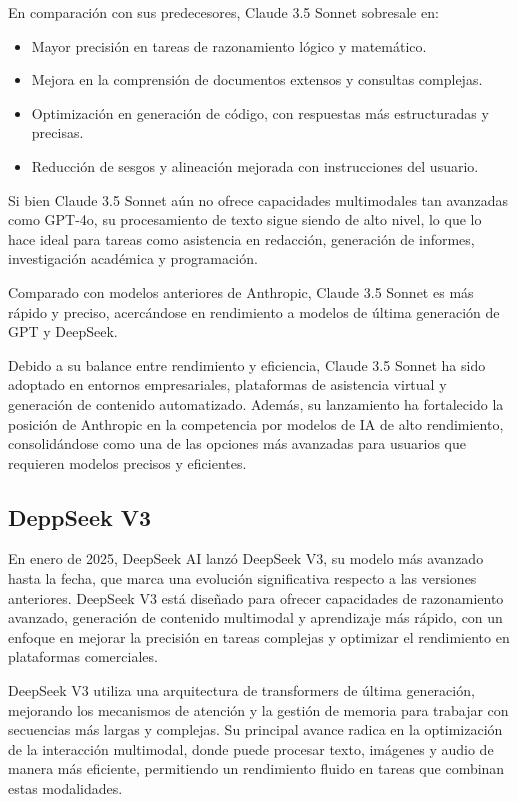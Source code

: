 En comparación con sus predecesores, Claude 3.5 Sonnet sobresale en:

\begin{itemize}
    \item Mayor precisión en tareas de razonamiento lógico y matemático.
    \item Mejora en la comprensión de documentos extensos y consultas complejas.
    \item Optimización en generación de código, con respuestas más estructuradas y precisas.
    \item Reducción de sesgos y alineación mejorada con instrucciones del usuario.
\end{itemize}

Si bien Claude 3.5 Sonnet aún no ofrece capacidades multimodales tan avanzadas como GPT-4o, su procesamiento de texto sigue siendo de alto nivel, lo que lo hace ideal para tareas como asistencia en redacción, generación de informes, investigación académica y programación.

Comparado con modelos anteriores de Anthropic, Claude 3.5 Sonnet es más rápido y preciso, acercándose en rendimiento a modelos de última generación de GPT y DeepSeek.

Debido a su balance entre rendimiento y eficiencia, Claude 3.5 Sonnet ha sido adoptado en entornos empresariales, plataformas de asistencia virtual y generación de contenido automatizado. 
Además, su lanzamiento ha fortalecido la posición de Anthropic en la competencia por modelos de IA de alto rendimiento, consolidándose como una de las opciones más avanzadas para usuarios que requieren modelos precisos y eficientes. 

\subsection{DeppSeek V3}

En enero de 2025, DeepSeek AI lanzó DeepSeek V3, su modelo más avanzado hasta la fecha, que marca una evolución significativa respecto a las versiones anteriores. 
DeepSeek V3 está diseñado para ofrecer capacidades de razonamiento avanzado, generación de contenido multimodal y aprendizaje más rápido, con un enfoque en mejorar la precisión en tareas complejas y optimizar el rendimiento en plataformas comerciales.

DeepSeek V3 utiliza una arquitectura de transformers de última generación, mejorando los mecanismos de atención y la gestión de memoria para trabajar con secuencias más largas y complejas. 
Su principal avance radica en la optimización de la interacción multimodal, donde puede procesar texto, imágenes y audio de manera más eficiente, permitiendo un rendimiento fluido en tareas que combinan estas modalidades.

